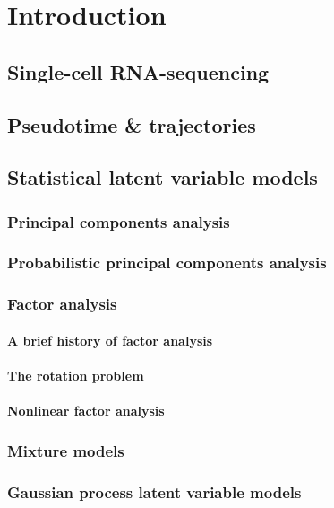 \chapter{Introduction}\label{ch:introduction}

\section{Single-cell RNA-sequencing}

\section{Pseudotime \& trajectories}

\section{Statistical latent variable models}

\subsection{Principal components analysis}

\subsection{Probabilistic principal components analysis}

\subsection{Factor analysis}

\subsubsection{A brief history of factor analysis}

\subsubsection{The rotation problem}

\subsubsection{Nonlinear factor analysis}

\subsection{Mixture models}

\subsection{Gaussian process latent variable models}
